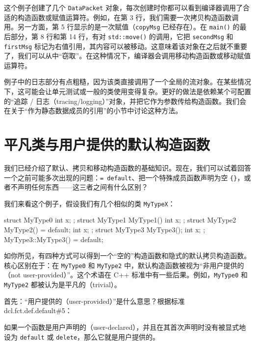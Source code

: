 这个例子创建了几个 \texttt{DataPacket} 对象，每次创建时你都可以看到编译器调用了合适的构造函数或赋值运算符。例如，在第 3 行，我们需要一次拷贝构造函数调用。另一方面，第 5 行显示的是一次赋值（\texttt{copyMsg} 已经存在）。在 \texttt{main()} 的最后部分，第 8 行和第 14 行，有对 \texttt{std::move()} 的调用，它把 \texttt{secondMsg} 和 \texttt{firstMsg} 标记为右值引用，其内容可以被移动。这意味着该对象在之后就不重要了，我们可以从中“窃取”。在这种情况下，编译器会调用移动构造函数或移动赋值运算符。

\begin{myInfoBox}
例子中的日志部分有点粗糙，因为该类直接调用了一个全局的流对象。在某些情况下，这可能会让单元测试或一般的类使用变得复杂。更好的做法是依赖某个可配置的“追踪 / 日志（tracing/logging）”对象，并把它作为参数传给构造函数。我们会在关于“作为静态数据成员的引用”的小节中讨论这种方法。
\end{myInfoBox}

\section{平凡类与用户提供的默认构造函数}

我们已经介绍了默认、拷贝和移动构造函数的基础知识。现在，我们可以试着回答一个之前可能多次出现的问题：\texttt{= default}、把一个特殊成员函数声明为空 \texttt{\{\}}，或者不声明任何东西——这三者之间有什么区别？

我们来看这个例子，假设我们有几个相似的类 \texttt{MyTypeX}：


\begin{codebox}[cpp]
struct MyType0 {
int x;
};
struct MyType1 {
MyType1() { }
int x;
};
struct MyType2 {
MyType2() = default;
int x;
};
struct MyType3 {
MyType3();
int x;
};
MyType3::MyType3() = default;
\end{codebox}

如你所见，有四种方式可以得到一个“空的”构造函数和隐式的默认拷贝构造函数。核心区别在于：在 \texttt{MyType0} 和 \texttt{MyType2} 中，默认构造函数被视为“非用户提供的（not user-provided）”。这个术语在 C++ 标准中有一些后果。例如，\texttt{MyType0} 和 \texttt{MyType2} 都被认为是平凡的（trivial）。

首先：“用户提供的（user-provided）”是什么意思？根据标准 dcl.fct.def.default\#5：

\begin{myQuote}
如果一个函数是用户声明的（user-declared），并且在其首次声明时没有被显式地设为 \texttt{default} 或 \texttt{delete}，那么它就是用户提供的。
\end{myQuote}

